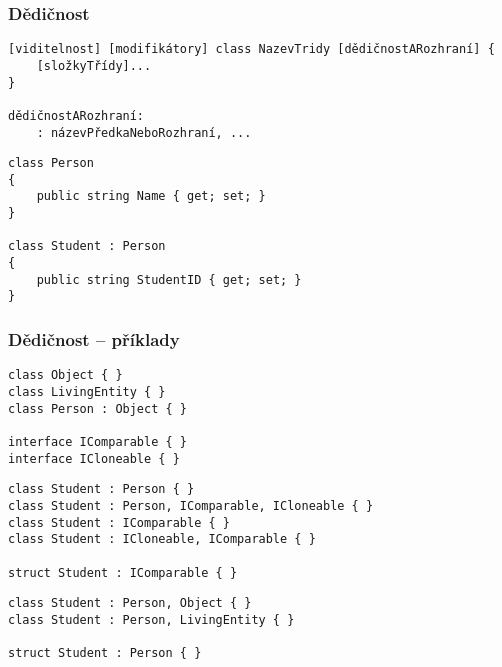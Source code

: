 \begin{frame}[fragile]
\frametitle{Dědičnost}
\begin{noteblock}{}
\begin{lstlisting}[basicstyle=\small]
[viditelnost] [modifikátory] class NazevTridy [dědičnostARozhraní] { 
	[složkyTřídy]...
}

dědičnostARozhraní:
	: názevPředkaNeboRozhraní, ...
\end{lstlisting}
\end{noteblock}
\vfill
\begin{yesblock}
\begin{lstlisting}[basicstyle=\small]
class Person
{
    public string Name { get; set; }
}

class Student : Person
{
    public string StudentID { get; set; }
}
\end{lstlisting}
\end{yesblock}
\end{frame}



\begin{frame}[fragile]
\frametitle{Dědičnost -- příklady}
\begin{noteblock}{}
\begin{lstlisting}[basicstyle=\small]
class Object { }
class LivingEntity { }
class Person : Object { }

interface IComparable { }
interface ICloneable { }
\end{lstlisting}
\end{noteblock}
\vfill
\begin{yesblock}
\begin{lstlisting}[basicstyle=\small]
class Student : Person { }
class Student : Person, IComparable, ICloneable { }
class Student : IComparable { }
class Student : ICloneable, IComparable { }

struct Student : IComparable { }
\end{lstlisting}
\end{yesblock}
\vfill
\begin{noblock}
\begin{lstlisting}[basicstyle=\small]
class Student : Person, Object { }
class Student : Person, LivingEntity { }

struct Student : Person { }
\end{lstlisting}
\end{noblock}
\end{frame}



